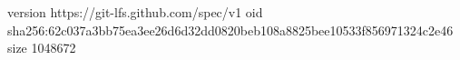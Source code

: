 version https://git-lfs.github.com/spec/v1
oid sha256:62c037a3bb75ea3ee26d6d32dd0820beb108a8825bee10533f856971324c2e46
size 1048672

